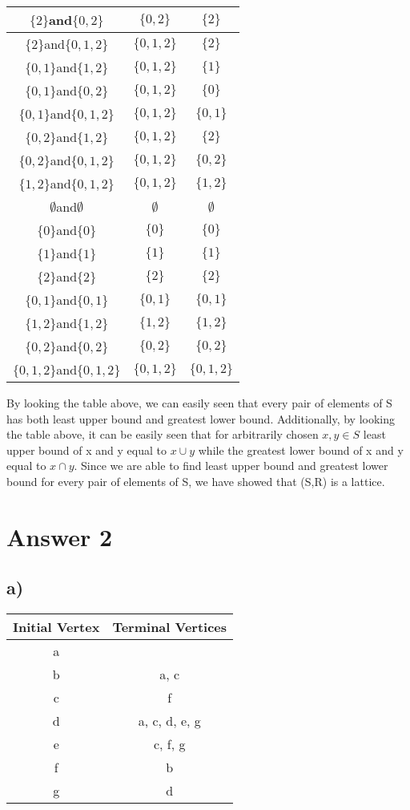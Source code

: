 \documentclass[11pt]{article}
\begin{document}
\begin{table}[H]
\begin{tabular}{|c|c|c|}
		$\{2\}$and$\{0,2\}$&$\{0,2\}$&$\{2\}$\\ \hline
		$\{2\}$and$\{0,1,2\}$&$\{0,1,2\}$&$\{2\}$\\ \hline
		$\{0,1\}$and$\{1,2\}$&$\{0,1,2\}$&$\{1\}$\\ \hline
		$\{0,1\}$and$\{0,2\}$&$\{0,1,2\}$&$\{0\}$\\ \hline
		$\{0,1\}$and$\{0,1,2\}$&$\{0,1,2\}$&$\{0,1\}$\\ \hline
		$\{0,2\}$and$\{1,2\}$&$\{0,1,2\}$&$\{2\}$\\ \hline
		$\{0,2\}$and$\{0,1,2\}$&$\{0,1,2\}$&$\{0,2\}$\\ \hline
		$\{1,2\}$and$\{0,1,2\}$&$\{0,1,2\}$&$\{1,2\}$\\ \hline
		$\emptyset$and$\emptyset$&$\emptyset$&$\emptyset$\\ \hline
		$\{0\}$and$\{0\}$&$\{0\}$&$\{0\}$\\ \hline
		$\{1\}$and$\{1\}$&$\{1\}$&$\{1\}$\\ \hline
		$\{2\}$and$\{2\}$&$\{2\}$&$\{2\}$\\ \hline
		$\{0,1\}$and$\{0,1\}$&$\{0,1\}$&$\{0,1\}$\\ \hline
		$\{1,2\}$and$\{1,2\}$&$\{1,2\}$&$\{1,2\}$\\ \hline
		$\{0,2\}$and$\{0,2\}$&$\{0,2\}$&$\{0,2\}$\\ \hline
		$\{0,1,2\}$and$\{0,1,2\}$&$\{0,1,2\}$&$\{0,1,2\}$\\ \hline
	\end{tabular}
\end{table}  
By looking the table above, we can easily seen that every pair of elements of S has both least upper bound and greatest lower bound. Additionally, by looking the table above, it can be easily seen that for arbitrarily chosen $x,y\in S$ least upper bound of x and y equal to $x \cup y $ while the greatest lower bound of x and y equal to $x \cap y$. Since we are able to find least upper bound and greatest lower bound for every pair of elements of S, we have showed that (S,R) is a lattice.

\section*{Answer 2}
\subsection*{a)}
\begin{table}[H]
	\centering
	\vspace{5px}
	\begin{tabular}{|c|c|}
		\hline
		Initial Vertex&Terminal Vertices\\ \hline
		a&\\ \hline
		b&a, c\\ \hline
		c&f\\ \hline
		d&a, c, d, e, g\\ \hline
		e&c, f, g\\ \hline
		f&b\\ \hline
		g&d\\ \hline
	\end{tabular}
\end{table}  
\end{document}
